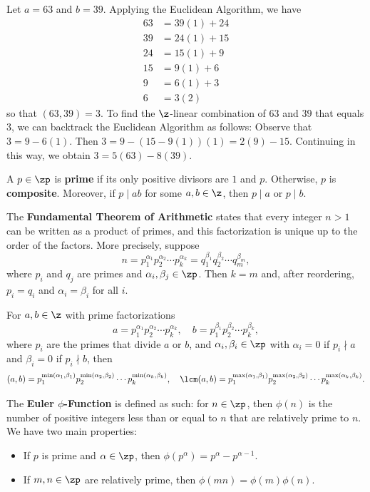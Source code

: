\ex Let $a = 63$ and $b = 39$. Applying the Euclidean Algorithm, we have
\begin{align*}
    63 & = 39(1) + 24 \\
    39 & = 24(1) + 15 \\
    24 & = 15(1) + 9 \\
    15 & = 9(1) + 6 \\
    9 & = 6(1) + 3 \\
    6 & = 3(2)
\end{align*}
so that $(63, 39) = 3$. To find the $\z$-linear combination of $63$ and $39$ that equals $3$, we can backtrack the Euclidean Algorithm as follows: Observe that $3 = 9 - 6(1)$. Then $3 = 9 - (15 - 9(1))(1) = 2(9) - 15$. Continuing in this way, we obtain $3 = 5(63) - 8(39)$.

 A $p \in \zp$ is \textbf{prime} if its only positive divisors are $1$ and $p$. Otherwise, $p$ is \textbf{composite}. Moreover, if $p \mid ab$ for some $a, b \in \z$, then $p \mid a$ or $p \mid b$.

 The \textbf{Fundamental Theorem of Arithmetic} states that every integer $n > 1$ can be written as a product of primes, and this factorization is unique up to the order of the factors. More precisely, suppose
\[n = p_1^{\alpha_1} p_2^{\alpha_2} \cdots p_k^{\alpha_k} = q_1^{\beta_1} q_2^{\beta_2} \cdots q_m^{\beta_m},\]
where $p_i$ and $q_j$ are primes and $\alpha_i, \beta_j \in \zp$. Then $k = m$ and, after reordering, $p_i = q_i$ and $\alpha_i = \beta_i$ for all $i$.

For $a, b \in \z$ with prime factorizations
\[a = p_1^{\alpha_1} p_2^{\alpha_2} \cdots p_k^{\alpha_k}, \quad b = p_1^{\beta_1} p_2^{\beta_2} \cdots p_k^{\beta_k},\]
where $p_i$ are the primes that divide $a$ or $b$, and $\alpha_i, \beta_i \in \zp$ with $\alpha_i = 0$ if $p_i \nmid a$ and $\beta_i = 0$ if $p_i \nmid b$, then
\[(a, b) = p_1^{\min(\alpha_1, \beta_1)} p_2^{\min(\alpha_2, \beta_2)} \cdots p_k^{\min(\alpha_k, \beta_k)}, \quad \lcm(a, b) = p_1^{\max(\alpha_1, \beta_1)} p_2^{\max(\alpha_2, \beta_2)} \cdots p_k^{\max(\alpha_k, \beta_k)}.\]

 The \textbf{Euler $\phi$-Function} is defined as such: for $n \in \zp$, then $\phi(n)$ is the number of positive integers less than or equal to $n$ that are relatively prime to $n$. We have two main properties:
\begin{itemize}
    \item If $p$ is prime and $\alpha \in \zp$, then $\phi(p^\alpha) = p^\alpha - p^{\alpha - 1}$.
    \item If $m, n \in \zp$ are relatively prime, then $\phi(mn) = \phi(m)\phi(n)$.
\end{itemize}

